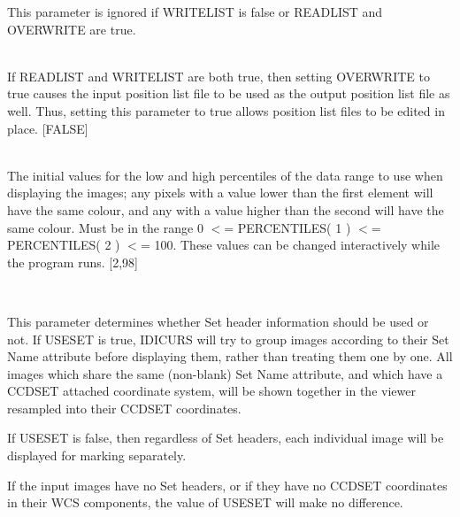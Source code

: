 \documentclass[twoside,11pt]{article}
\renewcommand{\_}{\texttt{\symbol{95}}}
\newcommand{\routine}[1]{{\sc #1}}
\newcommand{\sstsubsection}[1]{ \item[{#1}] \mbox{} \\}
\newcommand{\sstsubsection}[1]{\item[{#1}]}
\begin{document}
{{{         This parameter is ignored if WRITELIST is false or READLIST
         and OVERWRITE are true.
      }
      \sstsubsection{
         OVERWRITE = \_LOGICAL (Read)
      }{
         If READLIST and WRITELIST are both true, then setting OVERWRITE
         to true causes the input position list file to be used as
         the output position list file as well.  Thus, setting this
         parameter to true allows position list files to be edited in
         place.
         [FALSE]
      }
      \sstsubsection{
         PERCENTILES( 2 ) = \_DOUBLE (Read and Write)
      }{
         The initial values for the low and high percentiles of the data
         range to use when displaying the images; any pixels with a value
         lower than the first element will have the same colour, and any
         with a value higher than the second will have the same colour.
         Must be in the range 0 $<$= PERCENTILES( 1 ) $<$= PERCENTILES( 2 )
         $<$= 100.  These values can be changed interactively while the
         program runs.
         [2,98]
      }
      \sstsubsection{
         USESET = \_LOGICAL (Read)
      }{
         This parameter determines whether Set header information
         should be used or not.  If USESET is true,
         \routine{IDICURS} will try to group images according to their Set
         Name attribute before displaying them, rather than treating
         them one by one.  All images which share the same (non-blank)
         Set Name attribute, and which have a CCD\_SET attached
         coordinate system, will be shown together in the viewer
         resampled into their CCD\_SET coordinates.

         If USESET is false, then regardless of Set headers, each
         individual image will be displayed for marking separately.

         If the input images have no Set headers, or if they have no
         CCD\_SET coordinates in their WCS components, the value of
         USESET will make no difference.

}}}
\end{document}
